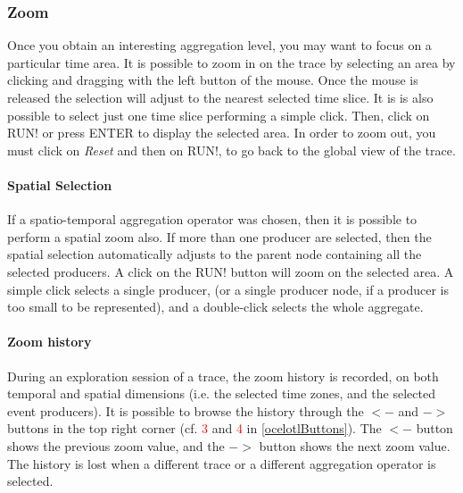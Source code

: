\documentclass[twoside]{article}
\begin{document}
\begin{sloppypar}
\subsubsection{Zoom}
Once you obtain an interesting aggregation level, you may want to focus on a particular time area. It is possible to zoom in on the trace by selecting an area by clicking and dragging with the left button of the mouse. Once the mouse is released the selection will adjust to the nearest selected time slice. It is is also possible to select just one time slice performing a simple click. Then, click on RUN! or press ENTER to display the selected area. In order to zoom out, you must click on \textit{Reset} and then on RUN!, to go back to the global view of the trace.

\paragraph{Spatial Selection}
If a spatio-temporal aggregation operator was chosen, then it is possible to perform a spatial zoom also. If more than one producer are selected, then the spatial selection automatically adjusts to the parent node containing all the selected producers. A click on the RUN! button will zoom on the selected area. A simple click selects a single producer, (or a single producer node, if a producer is too small to be represented), and a double-click selects the whole aggregate.

\paragraph{Zoom history}
During an exploration session of a trace, the zoom history is recorded, on both temporal and spatial dimensions (i.e. the selected time zones, and the selected event producers). It is possible to browse the history through the $<-$ and $->$ buttons in the top right corner (cf. \textcolor{red}{3} and \textcolor{red}{4} in \ref{ocelotlButtons}). The $<-$ button shows the previous zoom value, and the $->$ button shows the next zoom value. The history is lost when a different trace  or a different aggregation operator is selected.


\end{sloppypar}
\end{document}
